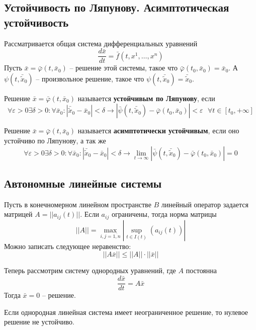 \subsection{Устойчивость по Ляпунову. Асимптотическая устойчивость}
Рассматривается общая система дифференциальных уравнений
\begin{equation}
	\frac{d\bar{x}}{dt} = \bar{f}(t, x^1, \dots, x^n)
\end{equation}
Пусть $\bar{x} = \bar{\varphi}(t, \bar{x}_0)$ -- решение этой системы, такое что $\bar{\varphi}(t_0, \bar{x}_0) = \bar{x}_0$. А $\psi(t, \bar{\tilde{x}}_0)$ -- произвольное решение, такое что $\psi(t, \bar{\tilde{x}}_0) = \bar{\tilde{x}}_0$.
\begin{definition}
	Решение $\bar{x} = \bar{\varphi}(t, \bar{x}_0)$ называется \textbf{устойчивым по Ляпунову}, если
	\[
		\forall \varepsilon >0\exists \delta > 0:\forall \bar{x}_0: |\bar{\tilde{x}}_0 - \bar{x}_0|<\delta \to |\bar{\psi}(t, \bar{\tilde{x}}_0) -  \bar{\varphi}(t_0, \bar{x}_0)|<\varepsilon\text{ } \forall t\in[t_0, +\infty]
	\]
\end{definition}
	
\begin{definition}
	Решение $\bar{x} = \bar{\varphi}(t, \bar{x}_0)$ называется \textbf{асимптотически устойчивым}, если оно устойчиво по Ляпунову, а так же
	\[
		\forall \varepsilon > 0\exists \delta>0:\forall \bar{x}_0: |\bar{\tilde{x}}_0 - \bar{x}_0|<\delta \to \lim_{t\to\infty}|\bar{\psi}(t, \bar{\tilde{x}}_0) -  \bar{\varphi}(t_0, \bar{x}_0)|=0
	\]
\end{definition}

\subsection{Автономные линейные системы}

Пусть в конечномерном линейном пространстве $B$ линейный оператор задается матрицей $A=||a_{ij}(t)||$. Если $a_{ij}$ ограничены, тогда норма матрицы 
\[
	||A|| = \max_{i,j =\overline{1,n}}|\sup_{t\in I(t)}(a_{ij}(t))|
\]
Можно записать следующее неравенство:
\[
	||A\bar{x}||\leq ||A||\cdot||\bar{x}||
\]

Теперь рассмотрим систему однородных уравнений, где $A$ постоянна
\begin{equation}
	\frac{d\bar{x}}{dt} = A\bar{x}
	\label{equ:issue12sys}
\end{equation}
Тогда $\bar{x} = 0$ -- решение.

\begin{lemma}
	Если однородная линейная система имеет неограниченное решение, то нулевое решение не устойчиво.
\end{lemma}

